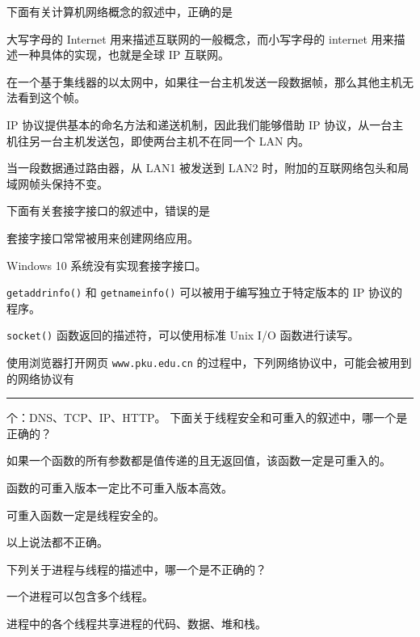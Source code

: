     \begin{problems}
         下面有关计算机网络概念的叙述中，正确的是
        \begin{choices}
            \item 大写字母的 Internet 用来描述互联网的一般概念，而小写字母的 internet 用来描述一种具体的实现，也就是全球 IP 互联网。
            \item 在一个基于集线器的以太网中，如果往一台主机发送一段数据帧，那么其他主机无法看到这个帧。
            \item IP 协议提供基本的命名方法和递送机制，因此我们能够借助 IP 协议，从一台主机往另一台主机发送包，即使两台主机不在同一个 LAN 内。
            \item 当一段数据通过路由器，从 LAN1 被发送到 LAN2 时，附加的互联网络包头和局域网帧头保持不变。
        \end{choices}
         下面有关套接字接口的叙述中，错误的是
        \begin{choices}
            \item 套接字接口常常被用来创建网络应用。
            \item Windows 10 系统没有实现套接字接口。
            \item \verb|getaddrinfo()| 和 \verb|getnameinfo()| 可以被用于编写独立于特定版本的 IP 协议的程序。
            \item \verb|socket()| 函数返回的描述符，可以使用标准 Unix I/O 函数进行读写。
        \end{choices}
         使用浏览器打开网页 \verb|www.pku.edu.cn| 的过程中，下列网络协议中，可能会被用到的网络协议有 \rule{2.5cm}{0.25mm} 个：DNS、TCP、IP、HTTP。
         下面关于线程安全和可重入的叙述中，哪一个是正确的？
        \begin{choices}
            \item 如果一个函数的所有参数都是值传递的且无返回值，该函数一定是可重入的。
            \item 函数的可重入版本一定比不可重入版本高效。
            \item 可重入函数一定是线程安全的。
            \item 以上说法都不正确。
        \end{choices}
         下列关于进程与线程的描述中，哪一个是不正确的？
        \begin{choices}
            \item 一个进程可以包含多个线程。
            \item 进程中的各个线程共享进程的代码、数据、堆和栈。

\end{choices}
\end{problems}

